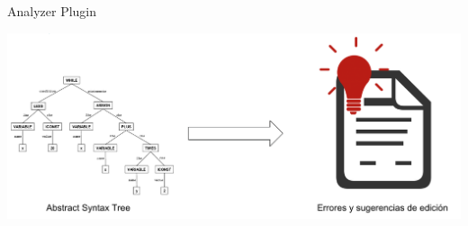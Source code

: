 \documentclass[aspectratio=169,10pt]{beamer}
\begin{document}
\begin{frame}[fragile]{Analyzer Plugin}
		\begin{center}
			\includegraphics[width=1.0\textwidth]{images/plugin.png}
		\end{center}
\end{frame}
\end{document}
